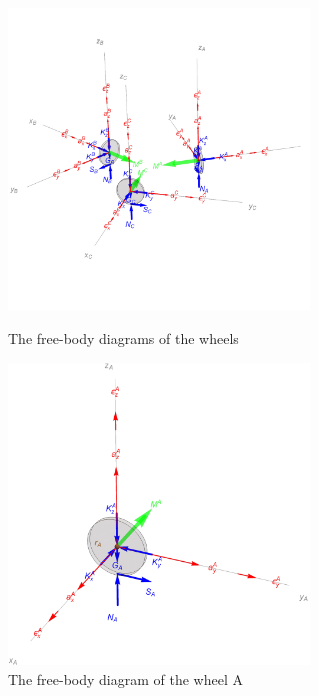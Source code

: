 \documentclass[12pt,english,twoside]{article}
\begin{document}
\begin{figure}[htb!]
	\centering
	\includegraphics[height=8cm]{figures/wheelsFBD}
	\caption{The free-body diagrams of the wheels}
	\label{wheelsFBD}
	\endminipage\hfill
	\centering
	\includegraphics[height=8cm]{figures/wheelFBD}
	\caption{The free-body diagram of the wheel A}
	\label{wheelFBD}
	\endminipage\hfill
\end{figure}
\end{document}
